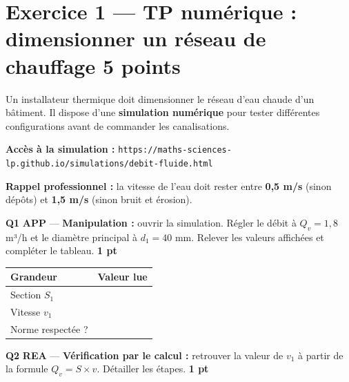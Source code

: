 \documentclass[a4paper,11pt]{article}
\newcommand{\pts}[1]{\hfill\textcolor{gris}{\small\textbf{#1}}}
\newcommand{\comp}[1]{\colorbox{blue!10}{\scriptsize\textbf{#1}}}
\begin{document}
\newpage

\section*{Exercice 1 — TP numérique : dimensionner un réseau de chauffage \pts{5 points}}

\begin{contextebox}
Un installateur thermique doit dimensionner le réseau d'eau chaude d'un bâtiment. Il dispose d'une \textbf{simulation numérique} pour tester différentes configurations avant de commander les canalisations.

\medskip
\textbf{Accès à la simulation :} \texttt{https://maths-sciences-lp.github.io/simulations/debit-fluide.html}

\medskip
\textbf{Rappel professionnel :} la vitesse de l'eau doit rester entre \textbf{0,5 m/s} (sinon dépôts) et \textbf{1,5 m/s} (sinon bruit et érosion).
\end{contextebox}

\vspace{6pt}
\textbf{Q1} \comp{APP} — \textbf{Manipulation :} ouvrir la simulation. Régler le débit à $Q_v = 1{,}8$ m³/h et le diamètre principal à $d_1 = 40$ mm. Relever les valeurs affichées et compléter le tableau. \pts{1 pt}

\begin{center}
\renewcommand{\arraystretch}{1.8}
\begin{tabular}{|>{\centering\arraybackslash}m{4cm}|>{\centering\arraybackslash}m{4cm}|}
\hline
\textbf{Grandeur} & \textbf{Valeur lue} \\
\hline
Section $S_1$ & \dotfill \\
\hline
Vitesse $v_1$ & \dotfill \\
\hline
Norme respectée ? & \dotfill \\
\hline
\end{tabular}
\renewcommand{\arraystretch}{1}
\end{center}

\textbf{Q2} \comp{REA} — \textbf{Vérification par le calcul :} retrouver la valeur de $v_1$ à partir de la formule $Q_v = S \times v$. Détailler les étapes. \pts{1 pt}

\begin{reponsebox}[3.5cm]
\dotfill

\dotfill

\dotfill

\dotfill
\end{reponsebox}
\end{document}
